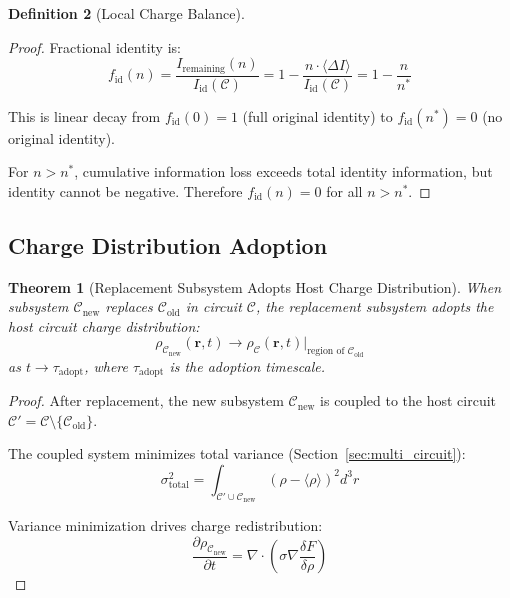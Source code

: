 \documentclass[12pt,a4paper]{article}
\theoremstyle{plain}
\newtheorem{theorem}{Theorem}[section]
\theoremstyle{definition}
\newtheorem{definition}[theorem]{Definition}
\theoremstyle{remark}
\begin{document}
\begin{definition}[Local Charge Balance]
\begin{proof}
Fractional identity is:
\begin{equation}
f_{\text{id}}(n) = \frac{I_{\text{remaining}}(n)}{I_{\text{id}}(\mathcal{C})} = 1 - \frac{n \cdot \langle \Delta I \rangle}{I_{\text{id}}(\mathcal{C})} = 1 - \frac{n}{n^*}
\end{equation}

This is linear decay from $f_{\text{id}}(0) = 1$ (full original identity) to $f_{\text{id}}(n^*) = 0$ (no original identity).

For $n > n^*$, cumulative information loss exceeds total identity information, but identity cannot be negative. Therefore $f_{\text{id}}(n) = 0$ for all $n > n^*$.
\end{proof}

\subsection{Charge Distribution Adoption}

\begin{theorem}[Replacement Subsystem Adopts Host Charge Distribution]
\label{thm:charge_adoption}
When subsystem $\mathcal{C}_{\text{new}}$ replaces $\mathcal{C}_{\text{old}}$ in circuit $\mathcal{C}$, the replacement subsystem adopts the host circuit charge distribution:
\begin{equation}
\rho_{\mathcal{C}_{\text{new}}}(\mathbf{r},t) \to \rho_{\mathcal{C}}(\mathbf{r},t) \Big|_{\text{region of } \mathcal{C}_{\text{old}}}
\end{equation}
as $t \to \tau_{\text{adopt}}$, where $\tau_{\text{adopt}}$ is the adoption timescale.
\end{theorem}

\begin{proof}
After replacement, the new subsystem $\mathcal{C}_{\text{new}}$ is coupled to the host circuit $\mathcal{C}' = \mathcal{C} \setminus \{\mathcal{C}_{\text{old}}\}$.

The coupled system minimizes total variance (Section~\ref{sec:multi_circuit}):
\begin{equation}
\sigma^2_{\text{total}} = \int_{\mathcal{C}' \cup \mathcal{C}_{\text{new}}} (\rho - \langle \rho \rangle)^2 d^3r
\end{equation}

Variance minimization drives charge redistribution:
\begin{equation}
\frac{\partial \rho_{\mathcal{C}_{\text{new}}}}{\partial t} = \nabla \cdot \left( \sigma \nabla \frac{\delta F}{\delta \rho} \right)
\end{equation}


\end{proof}
\end{definition}
\end{document}

